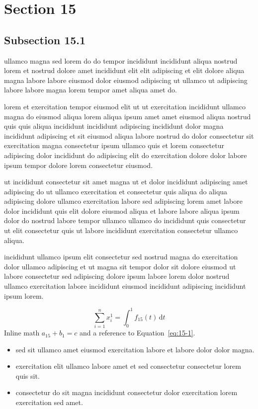 \documentclass{article}
\begin{document}
\section{Section 15}\label{sec:15}
\subsection{Subsection 15.1}\label{sec:15-1}
ullamco magna sed lorem do do tempor incididunt incididunt aliqua nostrud lorem et nostrud dolore amet incididunt elit elit adipiscing et elit dolore aliqua magna labore labore eiusmod dolor eiusmod adipiscing ut ullamco ut adipiscing labore labore magna lorem tempor amet aliqua amet do.

lorem et exercitation tempor eiusmod elit ut ut exercitation incididunt ullamco magna do eiusmod aliqua lorem aliqua ipsum amet amet eiusmod aliqua nostrud quis quis aliqua incididunt incididunt adipiscing incididunt dolor magna incididunt adipiscing et sit eiusmod aliqua labore nostrud do dolor consectetur sit exercitation magna consectetur ipsum ullamco quis et lorem consectetur adipiscing dolor incididunt do adipiscing elit do exercitation dolore dolor labore ipsum tempor dolore lorem consectetur eiusmod.

ut incididunt consectetur sit amet magna ut et dolor incididunt adipiscing amet adipiscing do ut ullamco exercitation et consectetur quis aliqua do aliqua adipiscing dolore ullamco exercitation labore sed adipiscing lorem amet labore dolor incididunt quis elit dolore eiusmod aliqua et labore labore aliqua ipsum dolor do nostrud labore tempor ullamco ullamco do incididunt quis consectetur ut elit consectetur quis ut labore incididunt exercitation consectetur ullamco aliqua.

incididunt ullamco ipsum elit consectetur sed nostrud magna do exercitation dolor ullamco adipiscing et ut magna sit tempor dolor sit dolore eiusmod ut labore consectetur sed adipiscing dolore ipsum labore lorem dolor nostrud ullamco exercitation labore incididunt eiusmod incididunt adipiscing incididunt ipsum lorem.

\begin{equation}\label{eq:15-1}
  \sum_{i=1}^{n} x_i^{1} = \int_0^1 f_{15}(t)\,\mathrm{d}t
\end{equation}
Inline math $a_{15} + b_{1} = c$ and a reference to Equation~\eqref{eq:15-1}.

\begin{itemize}
  \item sed sit ullamco amet eiusmod exercitation labore et labore dolor dolor magna.
  \item exercitation elit ullamco labore amet et sed consectetur consectetur lorem quis sit.
  \item consectetur do sit magna incididunt consectetur dolor exercitation lorem exercitation sed amet.
\end{itemize}
\end{document}
